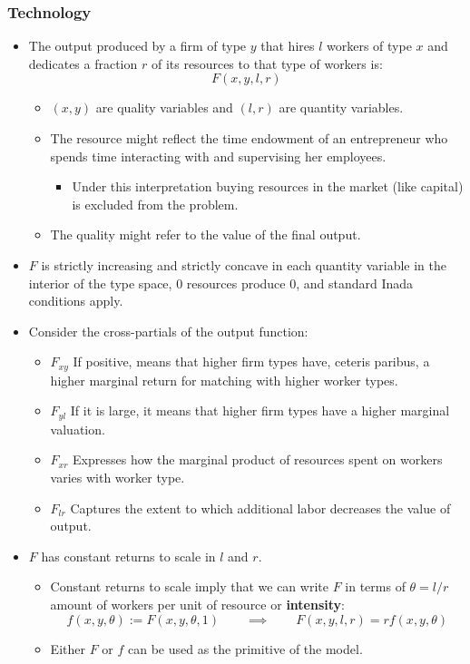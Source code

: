 \documentclass[12pt]{article}
\theoremstyle{definition}
\newcommand{\qiq}{\qquad \implies \qquad}
\begin{document}
\subsubsection{Technology}
\begin{itemize}
    \item The output produced by a firm of type $y$ that hires $l$ workers of type $x$ and dedicates a fraction $r$ of its resources to that type of workers is:$$F(x,y,l,r)$$
    \begin{itemize}
        \item $(x,y)$ are quality variables and $(l,r)$ are quantity variables.
        \item The resource might reflect the time endowment of an entrepreneur who spends time interacting with and supervising her employees.
        \begin{itemize}
            \item Under this interpretation buying resources in the market (like capital) is excluded from the problem.
        \end{itemize}
        \item The quality might refer to the value of the final output.
    \end{itemize}
    \item $F$ is strictly increasing and strictly concave in each quantity variable in the interior of the type space, $0$ resources produce $0$, and standard Inada conditions apply.
     \item  Consider the cross-partials of the output function:
    \begin{itemize}
      \item $F_{xy}$ If positive, means that higher firm types have, ceteris paribus, a higher marginal return for matching with higher worker types.
      \item $F_{yl}$ If it is large, it means that higher firm types have a higher marginal valuation.
      \item $F_{xr}$ Expresses how the marginal product of resources spent on workers varies with worker type.
      \item  $F_{lr}$ Captures the extent to which additional labor decreases the value of output.
    \end{itemize}

    \item  $F$ has constant returns to scale in $l$ and $r$.
    \begin{itemize}
        \item  Constant returns to scale imply that we can write $F$ in terms of $\theta=l/r$ amount of workers per unit of resource or \textbf{intensity}:$$f(x,y,\theta):=F(x,y,\theta,1)\qiq F(x,y,l,r) = rf(x,y,\theta)$$
        \item Either $F$ or $f$ can be used as the primitive of the model.
    \end{itemize}
\end{itemize}
\end{document}
